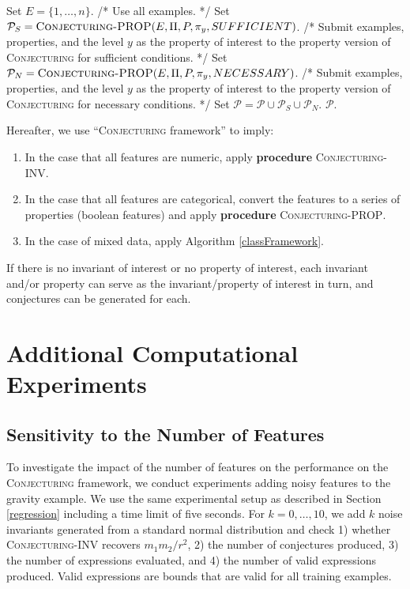 \documentclass[ijds,nonblindrev]{informs-ijds}
\begin{document}
\begin{algorithm}
\begin{algorithmic}[1]
  \State Set $E = \{1,\ldots, n\}$. \hfill /*  Use all examples. */
  \State Set $\mathcal{P}_S = \mbox{\textsc{Conjecturing-PROP}}(E, \Pi, P, \pi_y, SUFFICIENT)$.  /* Submit examples, properties, and the level $y$ as the property of interest to the property version of \textsc{Conjecturing} for sufficient conditions. */ \label{property}
  \State Set $\mathcal{P}_N = \mbox{\textsc{Conjecturing-PROP}}(E, \Pi, P, \pi_y, NECESSARY)$. /* Submit examples, properties, and the level $y$ as the property of interest to the property version of \textsc{Conjecturing} for necessary conditions. */ \label{property2}
  \State Set $\mathcal{P} = \mathcal{P} \cup \mathcal{P}_S \cup \mathcal{P}_N$.
\EndFor \label{endloop2}
\State \Return $\mathcal{P}$.
\end{algorithmic}
\end{algorithm}

Hereafter, we use ``\textsc{Conjecturing} framework'' to imply:
\begin{enumerate}
    \item In the case that all features are numeric, apply {\bf procedure} \textsc{Conjecturing-INV}.
    \item In the case that all features are categorical, convert the features to a series of properties (boolean features) and apply {\bf procedure} \textsc{Conjecturing-PROP}.
    \item In the case of mixed data, apply Algorithm \ref{classFramework}.
\end{enumerate}
If there is no invariant of interest or no property of interest, each invariant and/or property can serve as the invariant/property of interest in turn, and conjectures can be generated for each.

\section{Additional Computational Experiments}
\label{complexity}



\subsection{Sensitivity to the Number of Features}

To investigate the impact of the number of features on the performance on the \textsc{Conjecturing} framework, we conduct experiments adding noisy features to the gravity example.  We use the same experimental setup as described in Section \ref{regression} including a time limit of five seconds.  For $k=0,\ldots,10$, we add $k$ noise invariants generated from a standard normal distribution and check 1) whether \textsc{Conjecturing-INV} recovers $m_1m_2/r^2$, 2) the number of conjectures produced, 3) the number of expressions evaluated, and 4) the number of valid expressions produced.  Valid expressions are bounds that are valid for all training examples.  
\end{document}
